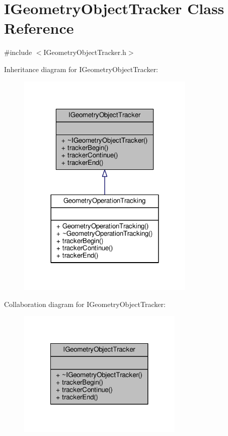 \hypertarget{class_i_geometry_object_tracker}{\section{I\-Geometry\-Object\-Tracker Class Reference}
\label{class_i_geometry_object_tracker}
}


{\ttfamily \#include $<$I\-Geometry\-Object\-Tracker.\-h$>$}



Inheritance diagram for I\-Geometry\-Object\-Tracker\-:\nopagebreak
\begin{figure}[H]
\begin{center}
\leavevmode
\includegraphics[width=240pt]{class_i_geometry_object_tracker__inherit__graph}
\end{center}
\end{figure}


Collaboration diagram for I\-Geometry\-Object\-Tracker\-:
\nopagebreak
\begin{figure}[H]
\begin{center}
\leavevmode
\includegraphics[width=224pt]{class_i_geometry_object_tracker__coll__graph}
\end{center}
\end{figure}
